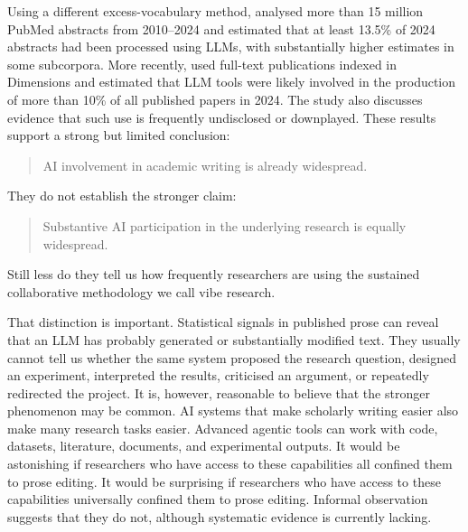 \documentclass[12pt]{article}
\begin{document}
Using a different excess-vocabulary method, \citet{kobakEtAl2024biomedical} analysed more than 15 million PubMed abstracts from 2010--2024 and estimated that at least 13.5\% of 2024 abstracts had been processed using LLMs, with substantially higher estimates in some subcorpora.
More recently, \citet{gray2025prevalence} used full-text publications indexed in Dimensions and estimated that LLM tools were likely involved in the production of more than 10\% of all published papers in 2024. The study also discusses evidence that such use is frequently undisclosed or downplayed. These results support a strong but limited conclusion:
\begin{quote}
AI involvement in academic writing is already widespread.
\end{quote}
They do not establish the stronger claim:
\begin{quote}
Substantive AI participation in the underlying research is equally widespread.
\end{quote}
Still less do they tell us how frequently researchers are using the sustained collaborative methodology we call vibe research.

That distinction is important. Statistical signals in published prose can reveal that an LLM has probably generated or substantially modified text. They usually cannot tell us whether the same system proposed the research question, designed an experiment, interpreted the results, criticised an argument, or repeatedly redirected the project.
It is, however, reasonable to believe that the stronger phenomenon may be common. AI systems that make scholarly writing easier also make many research tasks easier. Advanced agentic tools can work with code, datasets, literature, documents, and experimental outputs. It would be astonishing if researchers who have access to these capabilities all confined them to prose editing. It would be surprising if researchers who have access to these capabilities universally confined them to prose editing. Informal observation suggests that they do not, although systematic evidence is currently lacking.
\end{document}
